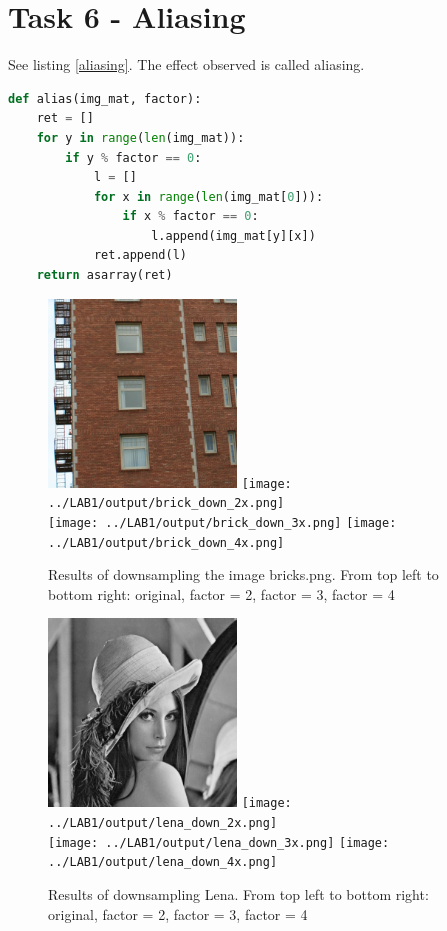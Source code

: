 \section*{Task 6 - Aliasing}

See listing \ref{aliasing}. The effect observed is called aliasing. 

\begin{lstlisting}[language=Python, label=aliasing, caption=Aliasing function]
def alias(img_mat, factor):
    ret = []
    for y in range(len(img_mat)):
        if y % factor == 0:
            l = []
            for x in range(len(img_mat[0])):
                if x % factor == 0:
                    l.append(img_mat[y][x])
            ret.append(l)
    return asarray(ret)
\end{lstlisting}

\begin{figure}[h!]
    \centering
    \includegraphics[width=5cm]{../LAB1/img/bricks.png}
    \texttt{[image: ../LAB1/output/brick\_down\_2x.png]} \\
    \texttt{[image: ../LAB1/output/brick\_down\_3x.png]}
    \texttt{[image: ../LAB1/output/brick\_down\_4x.png]}
    \caption{Results of downsampling the image bricks.png. From top left to bottom right: original, factor = 2, factor = 3, factor = 4}
\end{figure}


\begin{figure}[h!]
    \centering
    \includegraphics[width=5cm]{../LAB1/img/lena.png}
    \texttt{[image: ../LAB1/output/lena\_down\_2x.png]} \\
    \texttt{[image: ../LAB1/output/lena\_down\_3x.png]}
    \texttt{[image: ../LAB1/output/lena\_down\_4x.png]}
    \caption{Results of downsampling Lena. From top left to bottom right: original, factor = 2, factor = 3, factor = 4}
\end{figure}



